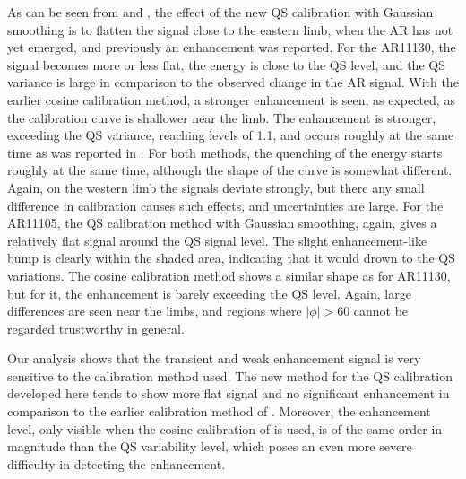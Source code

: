 \documentclass{aa}
\begin{document}
As can be seen
from  and , the effect of the new QS calibration with Gaussian smoothing is
to flatten the \fff signal close to the eastern limb, when the AR has not yet emerged, and previously an enhancement was reported. For the AR11130, the \fff signal becomes more or less flat, the \fff energy is close to the QS level, and the QS variance is large in comparison to the observed change in the AR \fff signal. With the earlier cosine calibration method, a stronger enhancement is seen, as expected, as the calibration curve is shallower near the limb. 
The enhancement is stronger, exceeding the QS variance, reaching levels of 1.1, and occurs roughly at the same time as was reported in \cite{SRB16}. For both methods, the quenching of the \fff energy starts roughly at the same time, although the shape of the curve is somewhat different. Again, on the western limb the \fff signals deviate strongly, but there any small difference in calibration causes such effects, and uncertainties are large. 
For the AR11105, the QS calibration method with Gaussian smoothing, again, gives a relatively flat signal around the QS signal level. The slight enhancement-like bump is clearly within the shaded area, indicating that it would drown to the QS variations. The cosine calibration method shows a similar shape as for AR11130, but for it, the enhancement is barely exceeding the QS level. Again, large differences are seen near the limbs, and regions where $|\phi|>60$ cannot be regarded trustworthy in general. 

Our analysis shows that the transient
and weak enhancement signal is very sensitive to the calibration
method used. The new method for the QS calibration developed here tends to show more flat signal and no significant enhancement in comparison to the earlier calibration method of \cite{SRB16}. Moreover, the enhancement level, only visible
when the cosine calibration of \cite{SRB16} is used, is of the same order 
in magnitude than
the QS variability level, which poses an even more severe difficulty in
detecting the enhancement.

\end{document}
